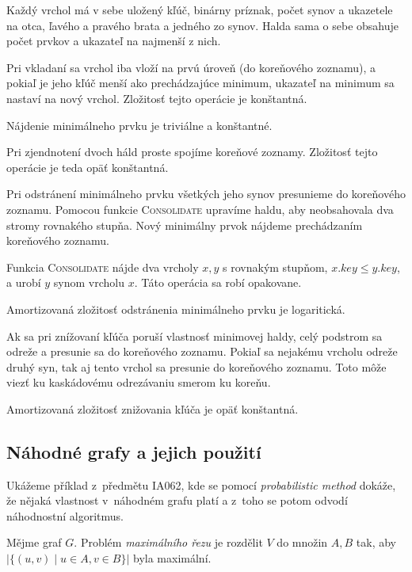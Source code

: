 Každý vrchol má v sebe uložený kľúč, binárny príznak, počet synov
a ukazetele na otca, ľavého a pravého brata a jedného zo synov.
Halda sama o sebe obsahuje počet prvkov a ukazateľ na najmenší z nich.

Pri vkladaní sa vrchol iba vloží na prvú úroveň (do koreňového zoznamu), 
a pokiaľ je jeho kľúč menší ako prechádzajúce minimum, ukazateľ
na minimum sa nastaví na nový vrchol. Zložitosť tejto operácie je konštantná.

Nájdenie minimálneho prvku je triviálne a konštantné.

Pri zjendnotení dvoch háld proste spojíme koreňové zoznamy. Zložitosť
tejto operácie je teda opäť konštantná.

Pri odstránení minimálneho prvku všetkých jeho synov presunieme do 
koreňového zoznamu. Pomocou funkcie \textsc{Consolidate} upravíme haldu,
aby neobsahovala dva stromy rovnakého stupňa. Nový minimálny 
prvok nájdeme prechádzaním koreňového zoznamu.

Funkcia \textsc{Consolidate} nájde dva vrcholy $x,y$ s rovnakým stupňom,
$x.key \leq y.key$, a urobí $y$ synom vrcholu $x$. Táto operácia
sa robí opakovane.

Amortizovaná zložitosť odstránenia minimálneho prvku je logaritická.

Ak sa pri znížovaní kľúča poruší vlastnosť minimovej haldy,
celý podstrom sa odreže a presunie sa do koreňového zoznamu.
Pokiaľ sa nejakému vrcholu odreže druhý syn, tak aj tento vrchol
sa presunie do koreňového zoznamu. Toto môže viezť ku kaskádovému
odrezávaniu smerom ku koreňu.

Amortizovaná zložitosť znižovania kľúča je opäť konštantná.



\subsection{Náhodné grafy a jejich použití}

Ukážeme příklad z~předmětu IA062, kde se pomocí {\em probabilistic
method} dokáže, že nějaká vlastnost v~náhodném grafu platí a z~toho se
potom odvodí náhodnostní algoritmus.


\begin{definition}
    Mějme graf $G$. Problém {\em maximálního řezu} je rozdělit $V$ do
    množin $A, B$ tak, aby $\lvert \{ (u,v) \mid u \in A, v \in B \}
    \rvert$ byla maximální.
\end{definition}

